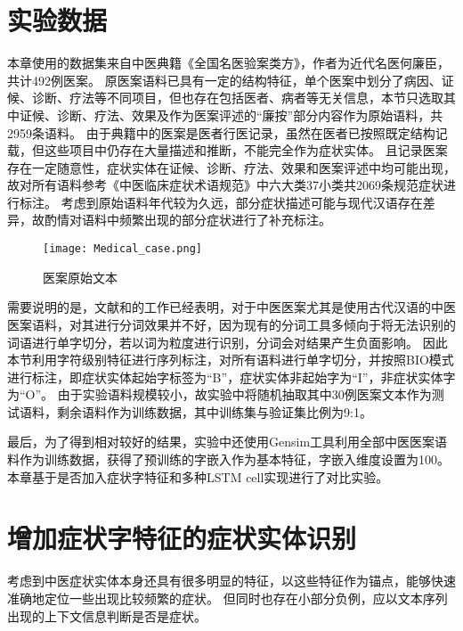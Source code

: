 \section{实验数据}
本章使用的数据集来自中医典籍《全国名医验案类方》，作者为近代名医何廉臣，共计492例医案。
原医案语料已具有一定的结构特征，单个医案中划分了病因、证候、诊断、疗法等不同项目，但也存在包括医者、病者等无关信息，本节只选取其中证候、诊断、疗法、效果及作为医案评述的“廉按”部分内容作为原始语料，共2959条语料。
由于典籍中的医案是医者行医记录，虽然在医者已按照既定结构记载，但这些项目中仍存在大量描述和推断，不能完全作为症状实体。
且记录医案存在一定随意性，症状实体在证候、诊断、疗法、效果和医案评述中均可能出现，故对所有语料参考《中医临床症状术语规范》中六大类37小类共2069条规范症状进行标注。
考虑到原始语料年代较为久远，部分症状描述可能与现代汉语存在差异，故酌情对语料中频繁出现的部分症状进行了补充标注。

\begin{figure}[H]
    \centering
    \texttt{[image: Medical\_case.png]}
    \caption{医案原始文本}
    \label{fig:medical_case}
\end{figure}

需要说明的是，文献和的工作已经表明，对于中医医案尤其是使用古代汉语的中医医案语料，对其进行分词效果并不好，因为现有的分词工具多倾向于将无法识别的词语进行单字切分，若以词为粒度进行识别，分词会对结果产生负面影响。
因此本节利用字符级别特征进行序列标注，对所有语料进行单字切分，并按照BIO模式进行标注，即症状实体起始字标签为“B”，症状实体非起始字为“I”，非症状实体字为“O”。
由于实验语料规模较小，故实验中将随机抽取其中30例医案文本作为测试语料，剩余语料作为训练数据，其中训练集与验证集比例为9:1。

最后，为了得到相对较好的结果，实验中还使用Gensim工具利用全部中医医案语料作为训练数据，获得了预训练的字嵌入作为基本特征，字嵌入维度设置为100。
本章基于是否加入症状字特征和多种LSTM cell实现进行了对比实验。

\section{增加症状字特征的症状实体识别}
考虑到中医症状实体本身还具有很多明显的特征，以这些特征作为锚点，能够快速准确地定位一些出现比较频繁的症状。
但同时也存在小部分负例，应以文本序列出现的上下文信息判断是否是症状。

